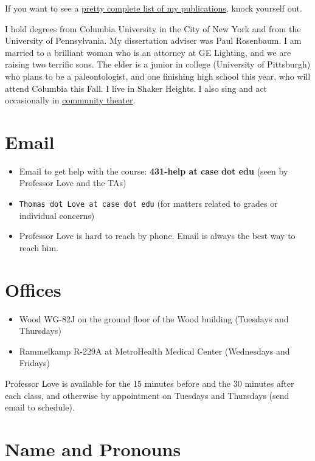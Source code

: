 \documentclass[
]{book}
\providecommand{\tightlist}{%
  \setlength{\itemsep}{0pt}\setlength{\parskip}{0pt}}
\begin{document}
If you want to see a \href{https://www.ncbi.nlm.nih.gov/myncbi/thomas.love.1/bibliography/public/}{pretty complete list of my publications}, knock yourself out.

I hold degrees from Columbia University in the City of New York and from the University of Pennsylvania. My dissertation adviser was Paul Rosenbaum. I am married to a brilliant woman who is an attorney at GE Lighting, and we are raising two terrific sons. The elder is a junior in college (University of Pittsburgh) who plans to be a paleontologist, and one finishing high school this year, who will attend Columbia this Fall. I live in Shaker Heights. I also sing and act occasionally in \href{https://github.com/THOMASELOVE/theater}{community theater}.

\hypertarget{email}{%
\section{Email}\label{email}}

\begin{itemize}
\tightlist
\item
  Email to get help with the course: \textbf{431-help at case dot edu} (seen by Professor Love and the TAs)
\item
  \texttt{Thomas\ dot\ Love\ at\ case\ dot\ edu} (for matters related to grades or individual concerns)
\item
  Professor Love is hard to reach by phone. Email is always the best way to reach him.
\end{itemize}

\hypertarget{offices}{%
\section{Offices}\label{offices}}

\begin{itemize}
\tightlist
\item
  Wood WG-82J on the ground floor of the Wood building (Tuesdays and Thursdays)
\item
  Rammelkamp R-229A at MetroHealth Medical Center (Wednesdays and Fridays)
\end{itemize}

Professor Love is available for the 15 minutes before and the 30 minutes after each class, and otherwise by appointment on Tuesdays and Thursdays (send email to schedule).

\hypertarget{name-and-pronouns}{%
\section{Name and Pronouns}\label{name-and-pronouns}}
\end{document}
